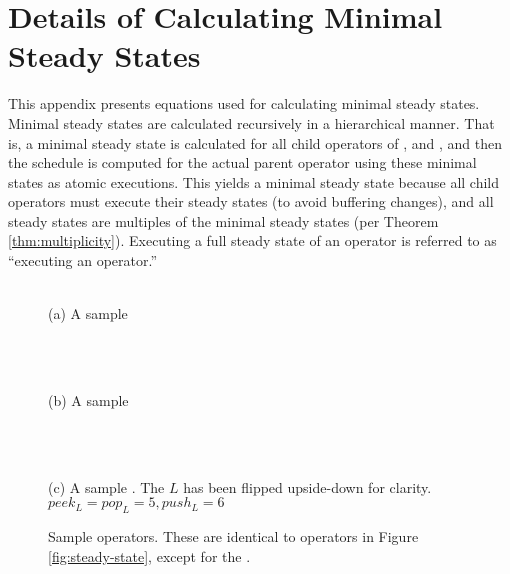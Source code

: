 \section{Details of Calculating Minimal Steady
States}
\label{apx:eqs}

This appendix presents equations used for calculating minimal
steady states.  Minimal steady states are calculated recursively
in a hierarchical manner. That is, a minimal steady state is
calculated for all child operators of {\pipeline}, {\splitjoin}
and {\feedbackloop}, and then the schedule is computed for the
actual parent operator using these minimal states as atomic
executions. This yields a minimal steady state because all child
operators must execute their steady states (to avoid buffering
changes), and all steady states are multiples of the minimal
steady states (per Theorem \ref{thm:multiplicity}).  Executing a
full steady state of an operator is referred to as ``executing an
operator.''

\begin{figure}
\begin{center}

\begin{minipage}{1.5in}
\centering {} \\
{\protect\small (a) A sample {\pipeline}}
\end{minipage}
~
\begin{minipage}{1.5in}
\centering {} \\
{\protect\small (b) A sample {\splitjoin}}
\end{minipage}
~
\begin{minipage}{2in}
\centering {} \\
{\protect\small (c) A sample {\feedbackloop}.  The $L$ {\filter}
has been flipped upside-down for clarity.\\$peek_L = pop_L = 5,
push_L = 6$}
\end{minipage}

\caption{Sample {\StreamIt} operators. These are identical to
operators in Figure \ref{fig:steady-state}, except for the
{\pipeline}.}
\label{fig:app:steady-state}

\end{center}
\end{figure}

\subsection{\filter}

